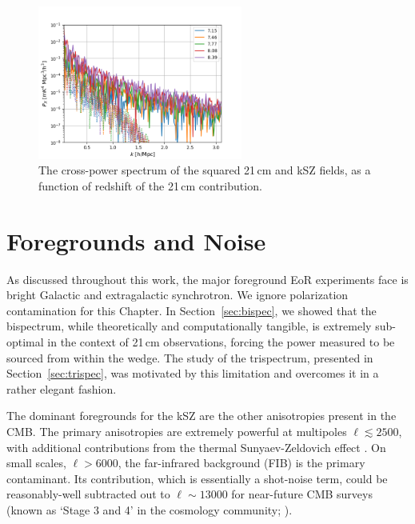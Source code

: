 \begin{figure}
\centering
\includegraphics[width=0.6\textwidth]{chapters/ksz_21cm/figures/trispec_estimator_filt_and_unfilt.png}
\caption[The cross-power spectrum of the squared 21\,cm and kSZ fields, as a function of redshift of the 21\,cm contribution.]{The cross-power spectrum of the squared 21\,cm and kSZ fields, as a function of redshift of the 21\,cm contribution.}
\label{fig:trispec_estimator_filt_unfilt}
\end{figure}

\section{Foregrounds and Noise}
\label{sec:Cl_fg_and_noise}
As discussed throughout this work, the major foreground EoR experiments face is bright Galactic and extragalactic synchrotron. We ignore polarization contamination for this Chapter. In Section~\ref{sec:bispec}, we showed that the bispectrum, while theoretically and computationally tangible, is extremely sub-optimal in the context of 21\,cm observations, forcing the power measured to be sourced from within the wedge. The study of the trispectrum, presented in Section~\ref{sec:trispec}, was motivated by this limitation and overcomes it in a rather elegant fashion.

The dominant foregrounds for the kSZ are the other anisotropies present in the CMB. The primary anisotropies are extremely powerful at multipoles $\ell \lesssim 2500$, with additional contributions from the thermal Sunyaev-Zeldovich effect \citep[e.g.][]{George.15}.
On small scales, $\ell > 6000$, the far-infrared background (FIB) is the primary contaminant. Its contribution, which is essentially a shot-noise term, could be reasonably-well subtracted out to $\ell\sim 13000$ for near-future CMB surveys (known as `Stage 3 and 4' in the cosmology community; \citealt{cmbS4.16}).

